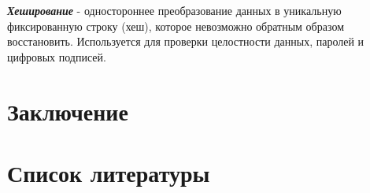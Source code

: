 \documentclass[utf8,14pt,a4paper,oneside,russian]{book}
\begin{document}
\textbf{\textit{Хеширование}} - одностороннее преобразование данных в уникальную фиксированную строку (хеш), которое невозможно обратным
образом восстановить. Используется для проверки целостности данных, паролей и цифровых подписей.



\newpage
\section{Заключение}



\newpage
\section{Список литературы}
\end{document}
